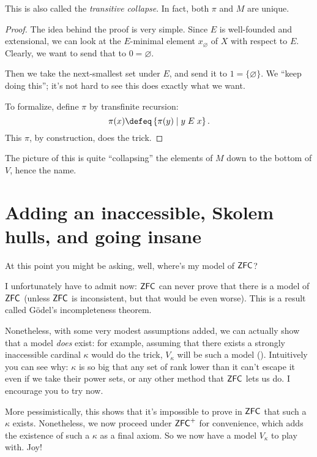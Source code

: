 This is also called the \emph{transitive collapse}.
In fact, both $\pi$ and $M$ are unique.

\begin{proof}
	The idea behind the proof is very simple.
	Since $E$ is well-founded and extensional, we can look at the
	$E$-minimal element $x_\varnothing$ of $X$ with respect to $E$.
	Clearly, we want to send that to $0 = \varnothing$.

	Then we take the next-smallest set under $E$, and send it to $1 = \{\varnothing\}$.
	We ``keep doing this''; it's not hard to see this does exactly what we want.

	To formalize, define $\pi$ by transfinite recursion:
	\[ \pi(x) \defeq \left\{ \pi(y) \mid y \; E \; x \right\}. \]
	This $\pi$, by construction, does the trick.
\end{proof}

The picture of this is quite ``collapsing'' the elements of $M$ down
to the bottom of $V$, hence the name.


\section{Adding an inaccessible, Skolem hulls, and going insane}
At this point you might be asking, well, where's my model of $\mathsf{ZFC}$?

I unfortunately have to admit now: $\mathsf{ZFC}$ can never prove that there is a model of $\mathsf{ZFC}$
(unless $\mathsf{ZFC}$ is inconsistent, but that would be even worse).
This is a result called G\"odel's incompleteness theorem.

Nonetheless, with some very modest assumptions added, we can actually show that a model \emph{does} exist:
for example, assuming that there exists a strongly inaccessible cardinal $\kappa$ would do the trick,
$V_\kappa$ will be such a model ().
Intuitively you can see why: $\kappa$ is so big that any set of rank lower than it can't escape it
even if we take their power sets, or any other method that $\mathsf{ZFC}$ lets us do.
I encourage you to try  now.

More pessimistically, this shows that it's impossible to prove in $\mathsf{ZFC}$ that such a $\kappa$ exists.
Nonetheless, we now proceed under $\mathsf{ZFC}^+$ for convenience, which adds the existence of such a $\kappa$
as a final axiom.
So we now have a model $V_\kappa$ to play with. Joy!

